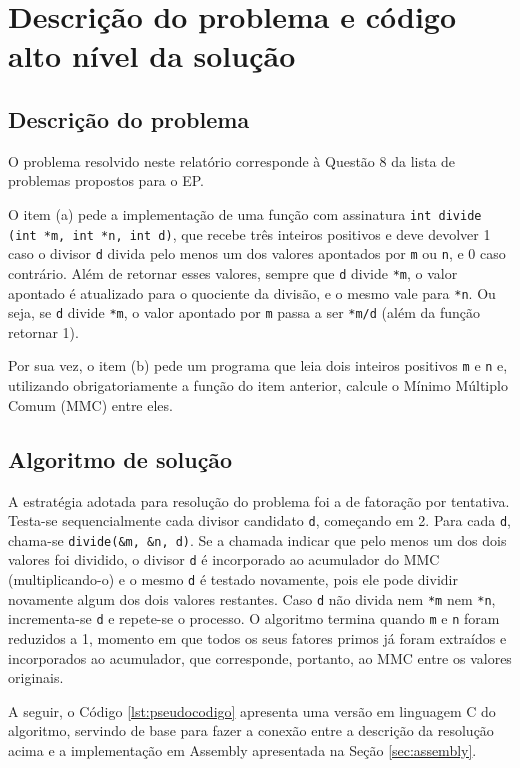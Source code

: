\section{Descrição do problema e código alto nível da solução}

\subsection{Descrição do problema}

O problema resolvido neste relatório corresponde à Questão 8 da lista de problemas propostos para o EP.

O item (a) pede a implementação de uma função com assinatura \texttt{int divide (int *m, int *n, int d)}, que 
recebe três inteiros positivos e deve devolver 1 caso o divisor \texttt{d} divida pelo menos um dos valores 
apontados por \texttt{m} ou \texttt{n}, e 0 caso contrário. Além de retornar esses valores, sempre que \texttt{d} divide \texttt{*m}, 
o valor apontado é atualizado para o quociente da divisão, e o mesmo vale para \texttt{*n}. Ou seja, se \texttt{d} 
divide \texttt{*m}, o valor apontado por \texttt{m} passa a ser \texttt{*m/d} (além da função retornar 1).

Por sua vez, o item (b) pede um programa que leia dois 
inteiros positivos \texttt{m} e \texttt{n} e, utilizando obrigatoriamente a função do item anterior, calcule o 
Mínimo Múltiplo Comum (MMC) entre eles.

\subsection{Algoritmo de solução}

A estratégia adotada para resolução do problema foi a de fatoração por tentativa. Testa-se sequencialmente cada divisor
candidato \texttt{d}, começando em 2. Para cada \texttt{d}, chama-se \texttt{divide(\&m, \&n, d)}. 
Se a chamada indicar que pelo menos um dos dois valores foi dividido, o divisor \texttt{d} é incorporado ao acumulador 
do MMC (multiplicando-o) e o mesmo \texttt{d} é testado novamente, pois ele pode dividir novamente algum dos dois valores 
restantes.
Caso \texttt{d} não divida nem \texttt{*m} nem \texttt{*n}, incrementa-se \texttt{d} e repete-se o processo.
O algoritmo termina quando \texttt{m} e \texttt{n} foram reduzidos a 1, momento em que todos os seus fatores primos
já foram extraídos e incorporados ao acumulador, que corresponde, portanto, ao MMC entre os
valores originais.

A seguir, o Código \ref{lst:pseudocodigo} apresenta uma versão em linguagem C do algoritmo, servindo de
base para fazer a conexão entre a descrição da resolução acima e a implementação em Assembly apresentada na Seção \ref{sec:assembly}.

